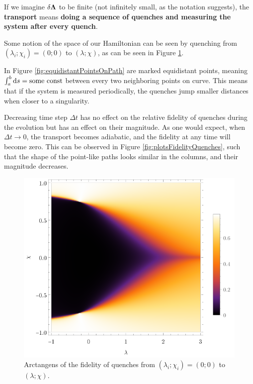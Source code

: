 If we imagine $\delta{\bm\Lambda}$ to be finite (not infinitely small, as the notation suggests), the \textbf{transport} means \textbf{doing a sequence of quenches and measuring the system after every quench}.


Some notion of the space of our Hamiltonian can be seen by quenching from $(\lambda_i;\chi_i)=(0;0)$ to $(\lambda;\chi)$, as can be seen in Figure \ref{fig:quenchFidelityFrom00}.

In Figure \ref{fig:equidistantPointsOnPath} are marked equidistant points, meaning $\int_a^b \mathrm{d} s=\text{some const}$ between every two neighboring points on curve. This means that if the system is measured periodically, the quenches jump smaller distances when closer to a singularity.

Decreasing time step $\Delta t$ has no effect on the relative fidelity of quenches during the evolution but has an effect on their magnitude. As one would expect, when $\Delta t\rightarrow 0$, the transport becomes adiabatic, and the fidelity at any time will become zero. This can be observed in Figure \ref{fig:plotsFidelityQuenches}, such that the shape of the point-like paths looks similar in the columns, and their magnitude decreases.

\begin{figure}[H]
    \centering
    \includegraphics[scale=1.2]{../img/quenchFidelityFrom00.pdf}
    \caption{Arctangens of the fidelity of quenches from $(\lambda_i;\chi_i)=(0;0)$ to $(\lambda;\chi)$.}
    \label{fig:quenchFidelityFrom00}    
\end{figure}

